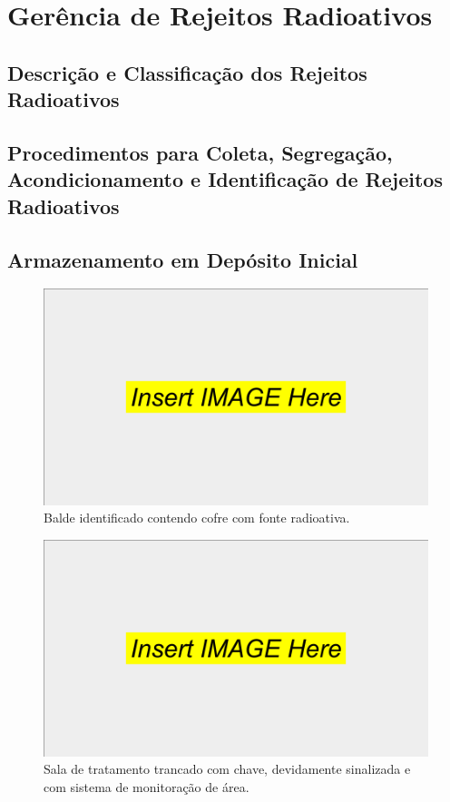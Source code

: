 \chapter{Gerência de Rejeitos Radioativos}
\label{ch:gerencia_rejeitos_radioativos}
\section{Descrição e Classificação dos Rejeitos Radioativos}


\section{Procedimentos para Coleta, Segregação, Acondicionamento e Identificação de Rejeitos Radioativos}

\section{Armazenamento em Depósito Inicial}

\begin{figure}[!h]
    \centering
    \includegraphics[width=0.75\linewidth]{./anexos/imagens/Gerencia Rejeitos Radioativos/gerencia_identificacao-balde.png}
    \caption{Balde identificado contendo cofre com fonte radioativa.}
    \label{fig:gerencia_identificacao-balde}
\end{figure}

\begin{figure}[!h]
    \centering
    \includegraphics[width=0.75\linewidth]{./anexos/imagens/Gerencia Rejeitos Radioativos/gerencia_sinalizacao-sala.png}
    \caption{Sala de tratamento trancado com chave, devidamente sinalizada e com sistema de monitoração de área.}
    \label{fig:gerencia_sinalizacao-sala}
\end{figure}


